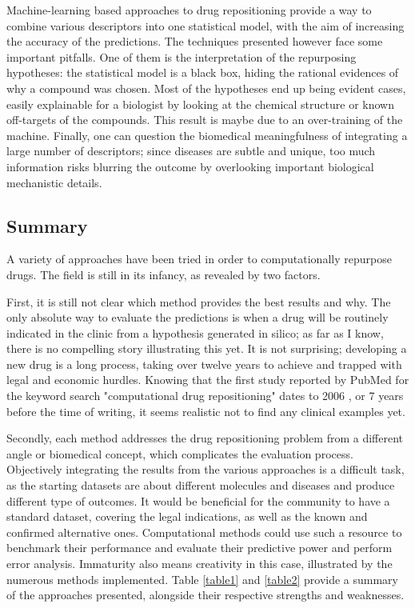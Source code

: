 Machine-learning based approaches to drug repositioning provide a way to combine various descriptors into one statistical model, with the aim of increasing the accuracy of the predictions. The techniques presented however face some important pitfalls. One of them is the interpretation of the repurposing hypotheses: the statistical model is a black box, hiding the rational evidences of why a compound was chosen. Most of the hypotheses end up being evident cases, easily explainable for a biologist by looking at the chemical structure or known off-targets of the compounds. This result is maybe due to an over-training of the machine. Finally, one can question the biomedical meaningfulness of integrating a large number of descriptors; since diseases are subtle and unique, too much information risks blurring the outcome by overlooking important biological mechanistic details.

\subsection{Summary}

A variety of approaches have been tried in order to computationally repurpose drugs. The field is still in its infancy, as revealed by two factors.

First, it is still not clear which method provides the best results and why. The only absolute way to evaluate the predictions is when a drug will be routinely indicated in the clinic from a hypothesis generated in silico; as far as I know, there is no compelling story illustrating this yet. It is not surprising; developing a new drug is a long process, taking over twelve years to achieve and trapped with legal and economic hurdles. Knowing that the first study reported by PubMed for the keyword search "computational drug repositioning" dates to 2006 \citep{an2006large}, or 7 years before the time of writing, it seems realistic not to find any clinical examples yet.

Secondly, each method addresses the drug repositioning problem from a different angle or biomedical concept, which complicates the evaluation process. Objectively integrating the results from the various approaches is a difficult task, as the starting datasets are about different molecules and diseases and produce different type of outcomes. It would be beneficial for the community to have a standard dataset, covering the legal indications, as well as the known and confirmed alternative ones. Computational methods could use such a resource to benchmark their performance and evaluate their predictive power and perform error analysis.
Immaturity also means creativity in this case, illustrated by the numerous methods implemented. Table \ref{table1} and \ref{table2} provide a summary of the approaches presented, alongside their respective strengths and weaknesses.

